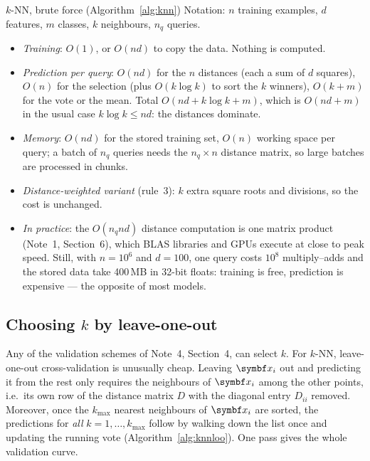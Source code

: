 \documentclass[11pt]{article}
\begin{document}
\begin{runtime}{$k$-NN, brute force (Algorithm~\ref{alg:knn})}
Notation: $n$ training examples, $d$ features, $m$ classes, $k$ neighbours, $n_q$ queries.
\begin{itemize}
\item \emph{Training}: $O(1)$, or $O(nd)$ to copy the data. Nothing is computed.
\item \emph{Prediction per query}: $O(nd)$ for the $n$ distances (each a sum of $d$ squares), $O(n)$ for the
selection (plus $O(k \log k)$ to sort the $k$ winners), $O(k + m)$ for the vote or the mean. Total
$O(nd + k\log k + m)$, which is $O(nd + m)$ in the usual case $k \log k \le nd$: the distances dominate.
\item \emph{Memory}: $O(nd)$ for the stored training set, $O(n)$ working space per query; a batch of $n_q$ queries
needs the $n_q \times n$ distance matrix, so large batches are processed in chunks.
\item \emph{Distance-weighted variant} (rule~3): $k$ extra square roots and divisions, so the cost is unchanged.
\item \emph{In practice}: the $O(n_q nd)$ distance computation is one matrix product (Note~1, Section~6), which BLAS
libraries and GPUs execute at close to peak speed. Still, with $n = 10^6$ and $d = 100$, one query costs $10^8$
multiply--adds and the stored data take 400\,MB in 32-bit floats: training is free, prediction is expensive --- the
opposite of most models.
\end{itemize}
\end{runtime}

\subsection{Choosing \texorpdfstring{$k$}{k} by leave-one-out}\label{sec:choosek}

Any of the validation schemes of Note~4, Section~4, can select $k$. For $k$-NN, leave-one-out cross-validation is
unusually cheap. Leaving $\x_i$ out and predicting it from the rest only requires the neighbours of $\x_i$ among the
other points, i.e.\ its own row of the distance matrix $D$ with the diagonal entry $D_{ii}$ removed. Moreover, once
the $k_{\max}$ nearest neighbours of $\x_i$ are sorted, the predictions for \emph{all} $k = 1, \dots, k_{\max}$ follow by walking down
the list once and updating the running vote (Algorithm~\ref{alg:knnloo}). One pass gives the whole validation curve.
\end{document}
